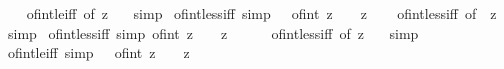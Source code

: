 \begin{isabellebody}
%
\isadelimproof
\ \ %
\endisadelimproof
%
\isatagproof
{}\isamarkupfalse%
\ of{\isacharunderscore}{\kern0pt}int{\isacharunderscore}{\kern0pt}le{\isacharunderscore}{\kern0pt}iff\ {\isacharbrackleft}{\kern0pt}of\ z\ {}{\isacharbrackright}{\kern0pt}\ \isamarkupfalse%
\ simp%
\endisatagproof
{\isafoldproof}%
%
\isadelimproof
\isanewline
%
\endisadelimproof
\isanewline
{}\isamarkupfalse%
\ of{\isacharunderscore}{\kern0pt}int{\isacharunderscore}{\kern0pt}{}{\isacharunderscore}{\kern0pt}less{\isacharunderscore}{\kern0pt}iff\ {\isacharbrackleft}{\kern0pt}simp{\isacharbrackright}{\kern0pt}{\isacharcolon}{\kern0pt}\ {\isachardoublequoteopen}{}\ {\isacharless}{\kern0pt}\ of{\isacharunderscore}{\kern0pt}int\ z\ {\isasymlongleftrightarrow}\ {}\ {\isacharless}{\kern0pt}\ z{\isachardoublequoteclose}\isanewline
%
\isadelimproof
\ \ %
\endisadelimproof
%
\isatagproof
{}\isamarkupfalse%
\ of{\isacharunderscore}{\kern0pt}int{\isacharunderscore}{\kern0pt}less{\isacharunderscore}{\kern0pt}iff\ {\isacharbrackleft}{\kern0pt}of\ {}\ z{\isacharbrackright}{\kern0pt}\ \isamarkupfalse%
\ simp%
\endisatagproof
{\isafoldproof}%
%
\isadelimproof
\isanewline
%
\endisadelimproof
\isanewline
{}\isamarkupfalse%
\ of{\isacharunderscore}{\kern0pt}int{\isacharunderscore}{\kern0pt}less{\isacharunderscore}{\kern0pt}{}{\isacharunderscore}{\kern0pt}iff\ {\isacharbrackleft}{\kern0pt}simp{\isacharbrackright}{\kern0pt}{\isacharcolon}{\kern0pt}\ {\isachardoublequoteopen}of{\isacharunderscore}{\kern0pt}int\ z\ {\isacharless}{\kern0pt}\ {}\ {\isasymlongleftrightarrow}\ z\ {\isacharless}{\kern0pt}\ {}{\isachardoublequoteclose}\isanewline
%
\isadelimproof
\ \ %
\endisadelimproof
%
\isatagproof
{}\isamarkupfalse%
\ of{\isacharunderscore}{\kern0pt}int{\isacharunderscore}{\kern0pt}less{\isacharunderscore}{\kern0pt}iff\ {\isacharbrackleft}{\kern0pt}of\ z\ {}{\isacharbrackright}{\kern0pt}\ \isamarkupfalse%
\ simp%
\endisatagproof
{\isafoldproof}%
%
\isadelimproof
\isanewline
%
\endisadelimproof
\isanewline
{}\isamarkupfalse%
\ of{\isacharunderscore}{\kern0pt}int{\isacharunderscore}{\kern0pt}{}{\isacharunderscore}{\kern0pt}le{\isacharunderscore}{\kern0pt}iff\ {\isacharbrackleft}{\kern0pt}simp{\isacharbrackright}{\kern0pt}{\isacharcolon}{\kern0pt}\ {\isachardoublequoteopen}{}\ {\isasymle}\ of{\isacharunderscore}{\kern0pt}int\ z\ {\isasymlongleftrightarrow}\ {}\ {\isasymle}\ z{\isachardoublequoteclose}\isanewline

\end{isabellebody}
